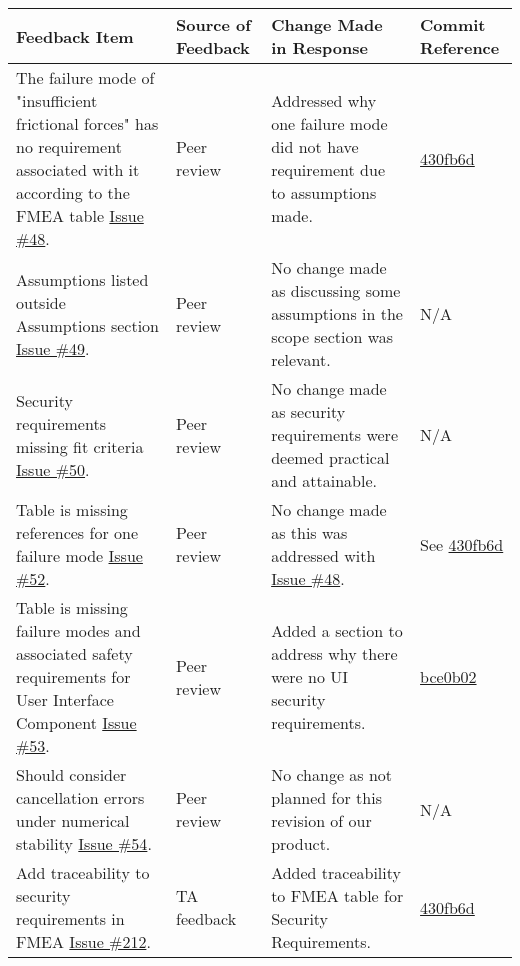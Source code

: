 \documentclass{article}
\begin{document}
    \begin{longtable}{|p{4cm}|p{1.5cm}|p{4cm}|p{1.5cm}|}
    \hline
    \textbf{Feedback Item} & \textbf{Source of Feedback} & \textbf{Change Made in Response} & \textbf{Commit Reference} \\
    \hline
    \endfirsthead
    \hline
    \endhead
    \hline
    \endfoot
    \hline
    \endlastfoot
    The failure mode of "insufficient frictional forces" has no requirement associated with it according to the FMEA table \href{https://github.com/gr812b/CVT-Simulator/issues/48}{Issue \#48}. & Peer review  & Addressed why one failure mode did not have requirement due to assumptions made. & 
    \href{https://github.com/gr812b/CVT-Simulator/commit/430fb6dd9bbe740c4c952e974f0799712f0055c0}{430fb6d} \\
    \hline
    Assumptions listed outside Assumptions section \href{https://github.com/gr812b/CVT-Simulator/issues/49}{Issue \#49}. & Peer review & No change made as discussing some assumptions in the scope section was relevant. & N/A\\
    \hline 
    Security requirements missing fit criteria \href{https://github.com/gr812b/CVT-Simulator/issues/50}{Issue \#50}. & Peer review & No change made as security requirements were deemed practical and attainable. & N/A\\
    \hline
    Table is missing references for one failure mode \href{https://github.com/gr812b/CVT-Simulator/issues/52}{Issue \#52}. & Peer review & No change made as this was addressed with \href{https://github.com/gr812b/CVT-Simulator/issues/48}{Issue \#48}. & See     \href{https://github.com/gr812b/CVT-Simulator/commit/430fb6dd9bbe740c4c952e974f0799712f0055c0}{430fb6d} \\
    \hline
    Table is missing failure modes and associated safety requirements for User Interface Component \href{https://github.com/gr812b/CVT-Simulator/issues/53}{Issue \#53}. & Peer review & Added a section to address why there were no UI security requirements. & \href{https://github.com/gr812b/CVT-Simulator/commit/bce0b0260aeedc43a905349bb702547b7a445af0}{bce0b02}\\
    \hline
    Should consider cancellation errors under numerical stability \href{https://github.com/gr812b/CVT-Simulator/issues/54}{Issue \#54}. & Peer review & No change as not planned for this revision of our product. & N/A\\
    \hline 
    Add traceability to security requirements in FMEA \href{https://github.com/gr812b/CVT-Simulator/issues/212}{Issue \#212}. & TA feedback & Added traceability to FMEA table for Security Requirements. & 
    \href{https://github.com/gr812b/CVT-Simulator/commit/430fb6dd9bbe740c4c952e974f0799712f0055c0}{430fb6d} \\ 

\end{longtable}
\end{document}
